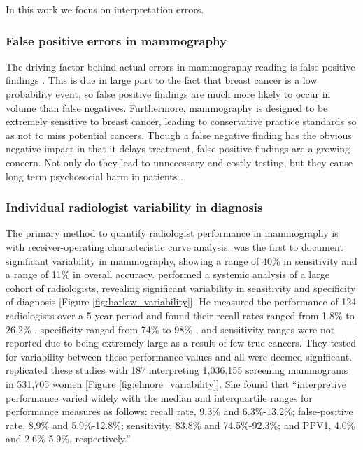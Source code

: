 In this work we focus on interpretation errors.

\subsubsection{False positive errors in mammography}
The driving factor behind actual errors in mammography reading is false positive findings \cite{Kerlikowske:2013ej}. This is due in large part to the fact that breast cancer is a low probability event, so false positive findings are much more likely to occur in volume than false negatives. Furthermore, mammography is designed to be extremely sensitive to breast cancer, leading to conservative practice standards so as not to miss potential cancers. Though a false negative finding has the obvious negative impact in that it delays treatment, false positive findings are a growing concern. Not only do they lead to unnecessary and costly testing, but they cause long term psychosocial harm in patients \cite{Brett:2005gq,Brodersen:2013kq}.


\subsubsection{Individual radiologist variability in diagnosis}
The primary method to quantify radiologist performance in mammography is with receiver-operating characteristic curve analysis.  was the first to document significant variability in mammography, showing a range of 40\% in sensitivity and a range of 11\% in overall accuracy. performed a systemic analysis of a large cohort of radiologists, revealing significant variability in sensitivity and specificity of diagnosis [Figure \ref{fig:barlow_variability}]. He measured the performance of 124 radiologists over a 5-year period and found their recall rates ranged from 1.8\% to 26.2\% , specificity ranged from 74\% to 98\% , and sensitivity ranges were not reported due to being extremely large as a result of few true cancers. They tested for variability between these performance values and all were deemed significant.  replicated these studies with 187 interpreting 1,036,155 screening mammograms in 531,705 women [Figure \ref{fig:elmore_variability}]. She found that ``interpretive performance varied widely with the median and interquartile ranges for performance measures as follows: recall rate, 9.3\% and 6.3\%-13.2\%; false-positive rate, 8.9\% and 5.9\%-12.8\%; sensitivity, 83.8\% and 74.5\%-92.3\%; and PPV1, 4.0\% and 2.6\%-5.9\%, respectively.''

